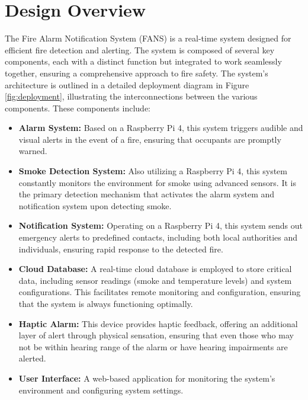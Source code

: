 \section{Design Overview}

The Fire Alarm Notification System (FANS) is a real-time system designed for efficient fire detection and alerting. The
system is composed of several key components, each with a distinct function but integrated to work seamlessly together,
ensuring a comprehensive approach to fire safety. The system's architecture is outlined in a detailed deployment
diagram in Figure \ref{fig:deployment}, illustrating the interconnections between the various components. These
components include:

\begin{itemize}
    \item \textbf{Alarm System:} Based on a Raspberry Pi 4, this system triggers audible and visual alerts in the event
          of a fire, ensuring that occupants are promptly warned.

    \item \textbf{Smoke Detection System:} Also utilizing a Raspberry Pi 4, this system constantly monitors the
          environment for smoke using advanced sensors. It is the primary detection mechanism that activates the alarm
          system and notification system upon detecting smoke.

    \item \textbf{Notification System:} Operating on a Raspberry Pi 4, this system sends out emergency alerts to
          predefined contacts, including both local authorities and individuals, ensuring rapid response to the detected
          fire.

    \item \textbf{Cloud Database:} A real-time cloud database is employed to store critical data, including sensor
          readings (smoke and temperature levels) and system configurations. This facilitates remote monitoring and
          configuration, ensuring that the system is always functioning optimally.

    \item \textbf{Haptic Alarm:} This device provides haptic feedback, offering an additional layer of alert through
          physical sensation, ensuring that even those who may not be within hearing range of the alarm or have hearing
          impairments are alerted.

    \item \textbf{User Interface:} A web-based application for monitoring the system's environment and configuring
          system settings.
\end{itemize}


